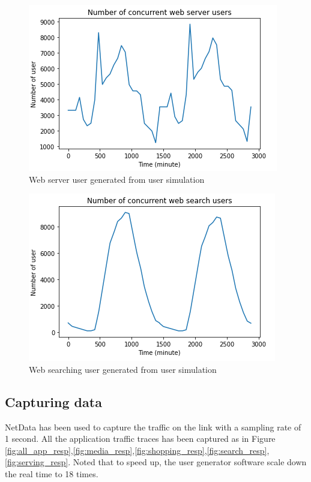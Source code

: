 \documentclass[conference]{IEEEtran}
\begin{document}
\begin{figure}[]
    \centering
        \includegraphics[scale = 0.8]{imgs/web_server_concurrent_user_2days.png}
        \caption{Web server user generated from user simulation}
        \label{fig:webServinguser}
    \end{figure}

\begin{figure}[]
    \centering
        \includegraphics[scale = 0.8]{imgs/web_search_concurrent_users_2days.png}
        \caption{Web searching user generated from user simulation}
        \label{fig:webSearching_user}
    \end{figure}

\subsection{Capturing data}

NetData has been used to capture the traffic on the link with a sampling rate of 1 second. All the application traffic traces has been captured as in Figure \ref{fig:all_app_resp},\ref{fig:media_resp},\ref{fig:shopping_resp},\ref{fig:search_resp},\ref{fig:serving_resp}. Noted that to speed up, the user generator software scale down the real time to 18 times.
\end{document}
